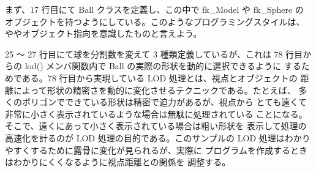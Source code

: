 まず、17 行目にて Ball クラスを定義し、この中で fk\_Model や fk\_Sphere の
オブジェクトを持つようにしている。このようなプログラミングスタイルは、
ややオブジェクト指向を意識したものと言えよう。

25 〜 27 行目にて球を分割数を変えて 3 種類定義しているが、これは
78 行目からの lod() メンバ関数内で Ball の実際の形状を動的に選択できるように
するためである。78 行目から実現している LOD 処理とは、視点とオブジェクトの
距離によって形状の精密さを動的に変化させるテクニックである。たとえば、
多くのポリゴンでできている形状は精密で迫力があるが、視点から
とても遠くて非常に小さく表示されているような場合は無駄に処理されている
ことになる。そこで、遠くにあって小さく表示されている場合は粗い形状を
表示して処理の高速化を計るのが LOD 処理の目的である。このサンプルの
LOD 処理はわかりやすくするために露骨に変化が見られるが、実際に
プログラムを作成するときはわかりにくくなるように視点距離との関係を
調整する。
\\
